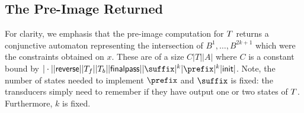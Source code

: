 {\subsection{The Pre-Image Returned}

For clarity, we emphasis that the pre-image computation for $T$
returns a conjunctive automaton representing the intersection of
$B^1, \ldots, B^{2k+1}$
which were the constraints obtained on $x$.
%
These are of a size $C|T||A|$ where $C$ is a constant bound by
$|\concat||\reverse||\Transducer_f||\Transducer_b||\finalpass||\suffix|^k|\prefix|^k|\init|$.
%
Note, the number of states needed to implement $\prefix$ and $\suffix$ is
fixed: the transducers simply need to remember if they have output one or two
states of $T$.
%
Furthermore, $k$ is fixed.
}
